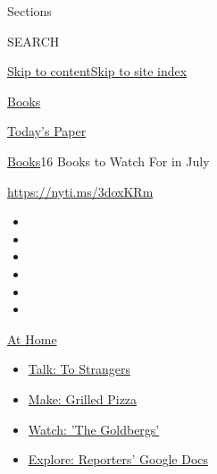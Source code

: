 Sections

SEARCH

\protect\hyperlink{site-content}{Skip to
content}\protect\hyperlink{site-index}{Skip to site index}

\href{https://www.nytimes3xbfgragh.onion/section/books}{Books}

\href{https://myaccount.nytimes3xbfgragh.onion/auth/login?response_type=cookie\&client_id=vi}{}

\href{https://www.nytimes3xbfgragh.onion/section/todayspaper}{Today's
Paper}

\href{/section/books}{Books}\textbar{}16 Books to Watch For in July

\url{https://nyti.ms/3doxKRm}

\begin{itemize}
\item
\item
\item
\item
\item
\item
\end{itemize}

\href{https://www.nytimes3xbfgragh.onion/spotlight/at-home?action=click\&pgtype=Article\&state=default\&region=TOP_BANNER\&context=at_home_menu}{At
Home}

\begin{itemize}
\tightlist
\item
  \href{https://www.nytimes3xbfgragh.onion/2020/08/03/well/family/the-benefits-of-talking-to-strangers.html?action=click\&pgtype=Article\&state=default\&region=TOP_BANNER\&context=at_home_menu}{Talk:
  To Strangers}
\item
  \href{https://www.nytimes3xbfgragh.onion/2020/08/01/at-home/coronavirus-make-pizza-on-a-grill.html?action=click\&pgtype=Article\&state=default\&region=TOP_BANNER\&context=at_home_menu}{Make:
  Grilled Pizza}
\item
  \href{https://www.nytimes3xbfgragh.onion/2020/07/31/arts/television/goldbergs-abc-stream.html?action=click\&pgtype=Article\&state=default\&region=TOP_BANNER\&context=at_home_menu}{Watch:
  'The Goldbergs'}
\item
  \href{https://www.nytimes3xbfgragh.onion/interactive/2020/at-home/even-more-reporters-editors-diaries-lists-recommendations.html?action=click\&pgtype=Article\&state=default\&region=TOP_BANNER\&context=at_home_menu}{Explore:
  Reporters' Google Docs}
\end{itemize}

